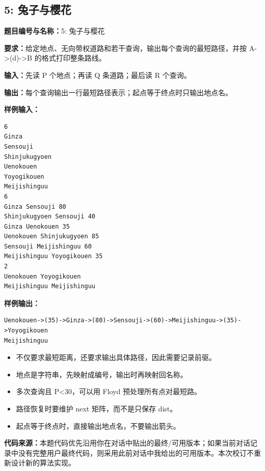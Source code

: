 \documentclass[10pt,a4paper,fontset=none]{ctexart}
\newcommand{\codesource}{\par\noindent\textbf{代码来源：}本题代码优先沿用你在对话中贴出的最终/可用版本；如果当前对话记录中没有完整用户最终代码，则采用此前对话中我给出的可用版本。本次校订不重新设计新的算法实现。\par\vspace{0.2em}}
\begin{document}
\subsection{5: 兔子与樱花}
\begin{taskbox}
\textbf{题目编号与名称：}5: 兔子与樱花\par
\textbf{要求：}给定地点、无向带权道路和若干查询，输出每个查询的最短路径，并按 A->(d)->B 的格式打印整条路线。\par
\textbf{输入：}先读 P 个地点；再读 Q 条道路；最后读 R 个查询。\par
\textbf{输出：}每个查询输出一行最短路径表示；起点等于终点时只输出地点名。\par
\textbf{样例输入：}
\begin{lstlisting}[style=sample]
6
Ginza
Sensouji
Shinjukugyoen
Uenokouen
Yoyogikouen
Meijishinguu
6
Ginza Sensouji 80
Shinjukugyoen Sensouji 40
Ginza Uenokouen 35
Uenokouen Shinjukugyoen 85
Sensouji Meijishinguu 60
Meijishinguu Yoyogikouen 35
2
Uenokouen Yoyogikouen
Meijishinguu Meijishinguu
\end{lstlisting}
\textbf{样例输出：}
\begin{lstlisting}[style=sample]
Uenokouen->(35)->Ginza->(80)->Sensouji->(60)->Meijishinguu->(35)->Yoyogikouen
Meijishinguu
\end{lstlisting}
\end{taskbox}
\begin{mistakebox}
\begin{itemize}
  \item 不仅要求最短距离，还要求输出具体路径，因此需要记录前驱。
  \item 地点是字符串，先映射成编号，输出时再映射回名称。
  \item 多次查询且 P<30，可以用 Floyd 预处理所有点对最短路。
  \item 路径恢复时要维护 next 矩阵，而不是只保存 dist。
  \item 起点等于终点时，直接输出地点名，不要输出箭头。
\end{itemize}
\end{mistakebox}
\codesource
\end{document}
